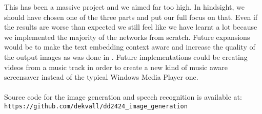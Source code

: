 \documentclass[../main.tex]{subfiles}
\begin{document}
This has been a massive project and we aimed far too high. In hindsight, we should have chosen one of the three parts and put our full focus on that. Even if the results are worse than expected we still feel like we have learnt a lot because we implemented the majority of the networks from scratch. Future expansions would be to make the text embedding context aware and increase the quality of the output images as was done in \cite{zhang2017stackgan}. Future implementations could be creating videos from a music track in order to create a new kind of music aware screensaver instead of the typical Windows Media Player one. 
\\\\
Source code for the image generation and speech recognition is available at:\\ \texttt{https://github.com/dekvall/dd2424\_image\_generation}
\end{document}
